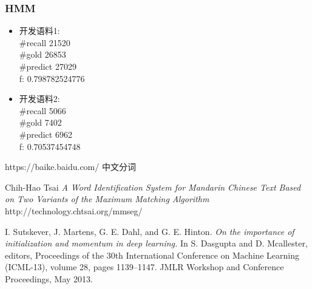\documentclass[titlepage]{article}
\begin{document}
\subsubsection{HMM}
\begin{itemize}
    \item 开发语料1:\\[1em]
        \#recall 21520\\
        \#gold 26853\\
        \#predict 27029\\
        f: 0.798782524776
    \item 开发语料2:\\[1em]
        \#recall 5066\\
        \#gold 7402\\
        \#predict 6962\\
        f: 0.70537454748
\end{itemize}
\begin{thebibliography}{1}

     https://baike.baidu.com/ 中文分词

     Chih-Hao Tsai \textit{A Word Identification System for Mandarin Chinese Text Based on Two Variants of the Maximum Matching Algorithm} http://technology.chtsai.org/mmseg/ 

     I. Sutskever, J. Martens, G. E. Dahl, and G. E. Hinton. \textit{On the importance of initialization and momentum in deep learning.} In S. Dasgupta and D. Mcallester, editors, Proceedings of the 30th International Conference on Machine Learning (ICML-13), volume 28, pages 1139–1147. JMLR Workshop and Conference Proceedings, May 2013.

\end{thebibliography}
\end{document}
